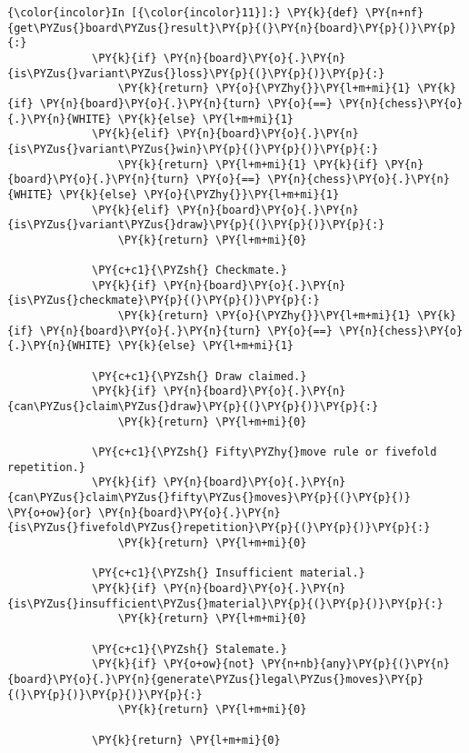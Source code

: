     \begin{Verbatim}[commandchars=\\\{\}]
{\color{incolor}In [{\color{incolor}11}]:} \PY{k}{def} \PY{n+nf}{get\PYZus{}board\PYZus{}result}\PY{p}{(}\PY{n}{board}\PY{p}{)}\PY{p}{:}
             \PY{k}{if} \PY{n}{board}\PY{o}{.}\PY{n}{is\PYZus{}variant\PYZus{}loss}\PY{p}{(}\PY{p}{)}\PY{p}{:}
                 \PY{k}{return} \PY{o}{\PYZhy{}}\PY{l+m+mi}{1} \PY{k}{if} \PY{n}{board}\PY{o}{.}\PY{n}{turn} \PY{o}{==} \PY{n}{chess}\PY{o}{.}\PY{n}{WHITE} \PY{k}{else} \PY{l+m+mi}{1}
             \PY{k}{elif} \PY{n}{board}\PY{o}{.}\PY{n}{is\PYZus{}variant\PYZus{}win}\PY{p}{(}\PY{p}{)}\PY{p}{:}
                 \PY{k}{return} \PY{l+m+mi}{1} \PY{k}{if} \PY{n}{board}\PY{o}{.}\PY{n}{turn} \PY{o}{==} \PY{n}{chess}\PY{o}{.}\PY{n}{WHITE} \PY{k}{else} \PY{o}{\PYZhy{}}\PY{l+m+mi}{1}
             \PY{k}{elif} \PY{n}{board}\PY{o}{.}\PY{n}{is\PYZus{}variant\PYZus{}draw}\PY{p}{(}\PY{p}{)}\PY{p}{:}
                 \PY{k}{return} \PY{l+m+mi}{0}
         
             \PY{c+c1}{\PYZsh{} Checkmate.}
             \PY{k}{if} \PY{n}{board}\PY{o}{.}\PY{n}{is\PYZus{}checkmate}\PY{p}{(}\PY{p}{)}\PY{p}{:}
                 \PY{k}{return} \PY{o}{\PYZhy{}}\PY{l+m+mi}{1} \PY{k}{if} \PY{n}{board}\PY{o}{.}\PY{n}{turn} \PY{o}{==} \PY{n}{chess}\PY{o}{.}\PY{n}{WHITE} \PY{k}{else} \PY{l+m+mi}{1}
         
             \PY{c+c1}{\PYZsh{} Draw claimed.}
             \PY{k}{if} \PY{n}{board}\PY{o}{.}\PY{n}{can\PYZus{}claim\PYZus{}draw}\PY{p}{(}\PY{p}{)}\PY{p}{:}
                 \PY{k}{return} \PY{l+m+mi}{0}
         
             \PY{c+c1}{\PYZsh{} Fifty\PYZhy{}move rule or fivefold repetition.}
             \PY{k}{if} \PY{n}{board}\PY{o}{.}\PY{n}{can\PYZus{}claim\PYZus{}fifty\PYZus{}moves}\PY{p}{(}\PY{p}{)} \PY{o+ow}{or} \PY{n}{board}\PY{o}{.}\PY{n}{is\PYZus{}fivefold\PYZus{}repetition}\PY{p}{(}\PY{p}{)}\PY{p}{:}
                 \PY{k}{return} \PY{l+m+mi}{0}
         
             \PY{c+c1}{\PYZsh{} Insufficient material.}
             \PY{k}{if} \PY{n}{board}\PY{o}{.}\PY{n}{is\PYZus{}insufficient\PYZus{}material}\PY{p}{(}\PY{p}{)}\PY{p}{:}
                 \PY{k}{return} \PY{l+m+mi}{0}
         
             \PY{c+c1}{\PYZsh{} Stalemate.}
             \PY{k}{if} \PY{o+ow}{not} \PY{n+nb}{any}\PY{p}{(}\PY{n}{board}\PY{o}{.}\PY{n}{generate\PYZus{}legal\PYZus{}moves}\PY{p}{(}\PY{p}{)}\PY{p}{)}\PY{p}{:}
                 \PY{k}{return} \PY{l+m+mi}{0}
             
             \PY{k}{return} \PY{l+m+mi}{0}
\end{Verbatim}

